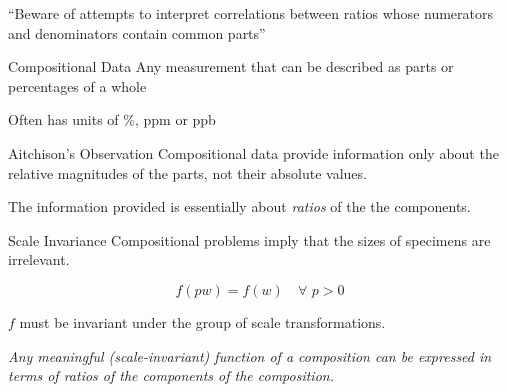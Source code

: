 \documentclass[dark]{cgem-presentation}
\begin{document}
\begin{frame}
	\LARGE
	\vspace{2cm}
	\begin{center}
		\textcolor{SecondColor}{
			``Beware of attempts to interpret correlations between ratios
			whose numerators and denominators contain common parts''
		}
	\end{center}

	\vspace{3.55cm}
	\large
	\begin{flushright}
		\cite{Pearson1897}
	\end{flushright}
\end{frame}

\begin{frame}{Compositional Data}
	\LARGE
	Any measurement that can be described as parts or percentages of a whole

	\vspace{5mm}
	Often has units of \%, ppm or ppb
\end{frame}

\begin{frame}{Aitchison's Observation}
	\LARGE
	\vspace{1cm}
	Compositional data provide information only about the relative
	magnitudes of the parts, not their absolute values.

	\vspace{5mm}
	The information provided is essentially about \textit{ratios} 
	of the the components.

	\vspace{1.62cm}
	\large
	\begin{flushright}
		\cite{Aitchison2005}
	\end{flushright}
\end{frame}

\begin{frame}{Scale Invariance}
	\LARGE
	Compositional problems imply that the sizes of specimens are irrelevant.

	\begin{equation*}
		f(pw) = f(w) \quad \forall \,\, p > 0
	\end{equation*}

	\vspace{5mm}
	$f$ must be invariant under the group of scale transformations.
\end{frame}

\begin{frame}
	\LARGE
	\begin{center}
		\textit{
			Any meaningful (scale-invariant) function of a composition
			can be expressed in terms of ratios of the components of the
			composition.
		}
	\end{center}
\end{frame}
\end{document}
